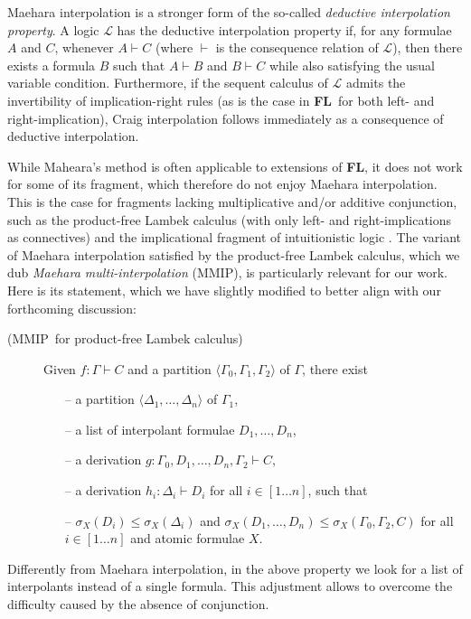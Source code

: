 \documentclass[sn-mathphys-num]{sn-jnl}%
\newcommand{\GG}{\Gamma}
\newcommand{\GD}{\Delta}
\newcommand{\vd}{\vdash}
\newcommand{\mc}[1]{\mathcal{#1}}
\newcommand{\gs}[1]{\sigma_{X} (#1)}
\newcommand{\FL}{\textbf{FL}}
\newcommand{\MMIP}{\textsf{MMIP}}
\newcommand{\niccolo}[1]{\textcolor{red}{NV: #1}}
\theoremstyle{thmstyleone}%
\theoremstyle{thmstyletwo}%
\theoremstyle{thmstylethree}%
\begin{document}
Maehara interpolation is a stronger form of the so-called \emph{deductive interpolation property}. A logic $\mc{L}$ has the deductive interpolation property if, for any formulae $A$ and $C$, whenever $A \vd C$ (where $\vd$ is the consequence relation of $\mc{L}$), then there exists a formula $B$ such that $A \vd B$ and $B \vd C$ while also satisfying the usual variable condition. Furthermore, if the sequent calculus of $\mc{L}$ admits the invertibility of implication-right rules (as is the case in \FL\ for both left- and right-implication), Craig interpolation follows immediately as a consequence of deductive interpolation.

While Maheara's method is often applicable to extensions of \FL, it does not work for some of its fragment, which therefore do not enjoy Maehara interpolation. This is the case for fragments lacking multiplicative and/or additive conjunction, such as the product-free Lambek calculus \cite{Pentus1997} (with only left- and right-implications as connectives) and the implicational fragment of intuitionistic logic \cite{Kanazawa2006}. 
The variant of Maehara interpolation satisfied by the product-free Lambek calculus, which we dub \emph{Maehara multi-interpolation} (\MMIP), is particularly relevant for our work. Here is its statement, which we have slightly modified to better align with our forthcoming discussion:
\begin{description}
  \item[(\MMIP~for product-free Lambek calculus)]  Given $f: \Gamma \vd C$ and a partition $\langle \GG_0,\GG_1, \GG_2 \rangle$ of $\GG$, there exist 
    \begin{itemize}
    \item[--] a partition $\langle \GD_1, \dots, \GD_n \rangle$ of $\GG_1$,
    \item[--] a list of interpolant formulae $D_1, \dots, D_n$,
    \item[--] a derivation $g: \GG_0, D_1, \dots, D_n, \GG_2 \vd C$,
    \item[--] a derivation $h_i : \GD_i \vd D_i$ for all $i \in [1\dots n]$, such that
    \item[--] $\gs{D_i} \leq \gs{\GD_i}$ and $\gs{D_1, \dots, D_n} \leq \gs{\GG_0, \GG_2, C}$ for all $i \in [1 \dots n]$ and atomic formulae $X$.
  \end{itemize}
\end{description}
Differently from Maehara interpolation, in the above property we look for a  list of interpolants instead of a single formula.
This adjustment allows to overcome the difficulty caused by the absence of conjunction.
\end{document}
